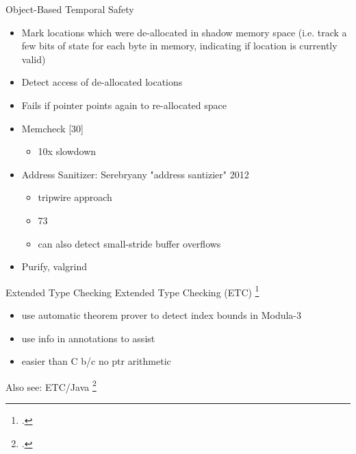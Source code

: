 \documentclass[aspectratio=169]{beamer}
\begin{document}
\begin{frame}{Object-Based Temporal Safety}
\begin{itemize}
\item Mark locations which were de-allocated in shadow memory space (i.e. track a few bits of state for each byte in memory, indicating if location is currently valid)
\item Detect access of de-allocated locations
\item Fails if pointer points again to re-allocated space
\item Memcheck [30] 
    \begin{itemize}
      \item 10x slowdown
    \end{itemize}
\item Address Sanitizer: Serebryany "address santizier" 2012
    \begin{itemize}
        \item tripwire approach
        \item 73%
        \item can also detect small-stride buffer overflows
    \end{itemize}
\item Purify, valgrind
\end{itemize}
\end{frame}

\begin{frame}[fragile]{Extended Type Checking}
Extended Type Checking (ETC) \footcite{detlefs_overview_1995}
    \begin{itemize}
      \item use automatic theorem prover to detect index bounds in Modula-3
      \item use info in annotations to assist
      \item easier than C b/c no ptr arithmetic
    \end{itemize}
Also see: ETC/Java \footcite{flanagan_extended_2002}
\end{frame}
\end{document}
